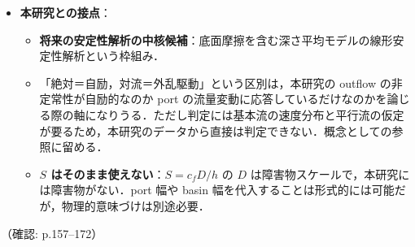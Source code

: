 \documentclass[11pt]{jsarticle}
\begin{document}
\begin{itemize}
  \item \textbf{本研究との接点}：
  \begin{itemize}
    \item \textbf{将来の安定性解析の中核候補}：底面摩擦を含む深さ平均モデルの線形安定性解析という枠組み．
    \item 「絶対＝自励，対流＝外乱駆動」という区別は，本研究の outflow の非定常性が自励的なのか port の流量変動に応答しているだけなのかを論じる際の軸になりうる．ただし判定には基本流の速度分布と平行流の仮定が要るため，本研究のデータから直接は判定できない．概念としての参照に留める．
    \item \textbf{$S$ はそのまま使えない}：$S = c_f D/h$ の $D$ は障害物スケールで，本研究には障害物がない．port 幅や basin 幅を代入することは形式的には可能だが，物理的意味づけは別途必要．
  \end{itemize}
\end{itemize}
\noindent（確認: p.157--172）
\end{document}
